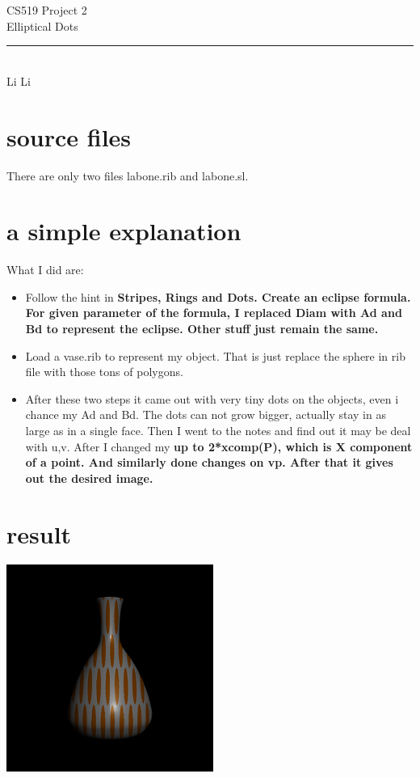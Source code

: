 \documentclass[12pt,letterpaper]{article}
\begin{document}
\begin{titlepage}
    \vspace*{4cm}
    \begin{flushleft}
    {\huge
        CS519 Project 2\\[.5cm]
    }
    {\large
        Elliptical Dots
    }
    \end{flushleft}
    \vfill
    \rule{5in}{.5mm}\\
    Li Li

\end{titlepage}
\section{source files}
There are only two files labone.rib and labone.sl.
\section{a simple explanation}
What I did are:
\begin{itemize}
\item Follow the hint in \bf {Stripes, Rings and Dots}. Create an
  eclipse formula. For given parameter of the formula, I replaced Diam
  with Ad and Bd to represent the eclipse. Other stuff just remain the same.
\item Load a vase.rib to represent my object. That is just replace the
  sphere in rib file with those tons of polygons.
\item After these two steps it came out with very tiny dots on the
  objects, even i chance my Ad and Bd. The dots can not grow bigger,
  actually stay in as large as in a single face. Then I went to the
  notes and find out it may be deal with u,v. After I changed my \bf {up} to
  2*xcomp(P), which is X component of a point. And similarly done
  changes on \bf {vp}. After that it gives out the desired image.
\end{itemize}
\section{result}
\begin{center}
\includegraphics[scale = 1.5]{labone.png}
\end{center}
\end{document}
